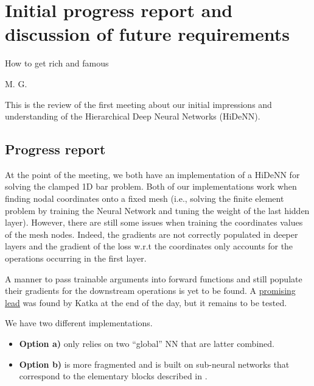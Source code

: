 \chapter[The 18$^{\text{th}}$ of January 2024 - Requirements \& Initial understanding]{Initial progress report and discussion of future requirements}

{\color{accentcolor} \epigraph{How to get rich and famous}{M. G.}}

\begin{chapabstract}
    This is the review of the first meeting about our initial impressions and understanding of the Hierarchical Deep Neural Networks (HiDeNN).
\end{chapabstract}

\minitoc

\section{Progress report}
At the point of the meeting, we both have an implementation of a HiDeNN for solving the clamped 1D bar problem. Both of our implementations work when finding nodal coordinates onto a fixed mesh (i.e., solving the finite element problem by training the Neural Network and tuning the weight of the last hidden layer). However, there are still some issues when training the coordinates values of the mesh nodes. Indeed, the gradients are not correctly populated in deeper layers and the gradient of the loss w.r.t the coordinates only accounts for the operations occurring in the first layer. 

A manner to pass trainable arguments into forward functions and still populate their gradients for the downstream operations is yet to be found. A \href{https://discuss.pytorch.org/t/reusing-altered-parameters-in-more-than-one-layer/158106/2}{promising lead} was found by Katka at the end of the day, but it remains to be tested.


We have two different implementations. 
\begin{itemize}
    \item[\faCodeBranch] \textbf{Option a)} only relies on two ``global'' NN that are latter combined. 
    \item[\faCodeBranch] \textbf{Option b)} is more fragmented and is built on sub-neural networks that correspond to the elementary blocks described in \parencite{zhang_hierarchical_2021}.
\end{itemize}

